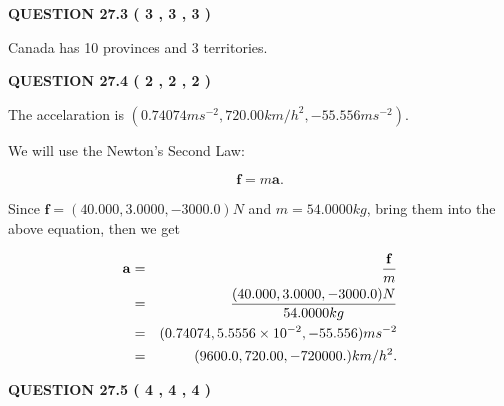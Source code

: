 \documentclass[12pt]{article}
\begin{document}
{\textbf{\Large{QUESTION
27.3 
 (           3 ,           3 ,           3 )
}}}
  
  
 
 
\noindent{}
 
 
Canada has  %
10 provinces and  %
3 territories.
 
 
 
 
  
\vspace{0.2in}
  
{\textbf{\Large{QUESTION
27.4 
 (           2 ,           2 ,           2 )
}}}
  
  
 
 
\noindent{}
 
 
The accelaration is
$(
0.74074ms^{-2},
720.00km/h^2,
-55.556ms^{-2}
).
$
 
 
 
 
 
 
\noindent{}

We will use the Newton's Second Law:
 
\[
\mathbf{f}=m\mathbf{a}.
\]
 
Since $\mathbf{f}=( %
40.000,  %
3.0000,  %
-3000.0 )N$
and $m= %
54.0000kg$, bring them into the above equation, then we get
 
\begin{eqnarray*}
\mathbf{a}&=&\frac{\mathbf{f}}m  \\
&=&\frac{(
40.000 ,
3.0000 ,
-3000.0 )N
}{ %
54.0000 kg}  \\
&=&(
0.74074 ,
5.5556 \times 10^{-2},
-55.556
)ms^{-2} \\
&=&(
9600.0 ,
720.00 ,
-720000.
)km/h^2.
\end{eqnarray*}
 
 
 
  
\vspace{0.2in}
  
{\textbf{\Large{QUESTION
27.5 
 (           4 ,           4 ,           4 )
}}}
  
  
 
 
\noindent{}
  
\end{document}
